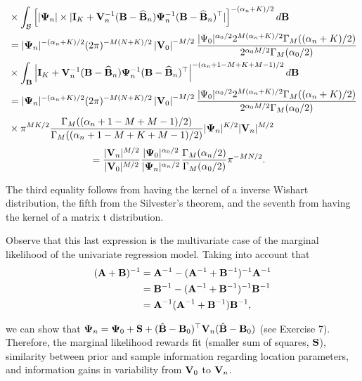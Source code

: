 \begin{align*}
	&\times \int_{\mathcal{B}}\left[|{\bf{\Psi}}_n|\times |{\bf{I}}_{K}+{\bf{V}}_n^{-1}({\bf{B}}-\widehat{\bf{B}}_n){\bf{\Psi}}_n^{-1}({\bf{B}}-\widehat{\bf{B}}_n)^{\top}|\right]^{-(\alpha_n+K)/2}d{\bf{B}}\\
	&=|{\bf{\Psi}}_n|^{-(\alpha_n+K)/2}(2\pi)^{-M(N+K)/2}\left|{\bf V}_0\right|^{-M/2}\frac{|\Psi_0|^{\alpha_0/2}2^{M(\alpha_n+K)/2}\Gamma_M((\alpha_n+K)/2)}{2^{\alpha_0M/2}\Gamma_M(\alpha_0/2)}\\
	&\times \int_{\mathcal{{\bf{B}}}}\left| {\bf{I}}_{K}+{\bf{V}}_n^{-1}({\bf{B}}-\widehat{\bf{B}}_n){\bf{\Psi}}_n^{-1}({\bf{B}}-\widehat{\bf{B}}_n)^{\top}\right|^{-(\alpha_n+1-M+K+M-1)/2}d{\bf{B}}\\
	&=|{\bf{\Psi}}_n|^{-(\alpha_n+K)/2}(2\pi)^{-M(N+K)/2}\left|{\bf V}_0\right|^{-M/2}\frac{|\Psi_0|^{\alpha_0/2}2^{M(\alpha_n+K)/2}\Gamma_M((\alpha_n+K)/2)}{2^{\alpha_0M/2}\Gamma_M(\alpha_0/2)}\\
	&\times \pi^{MK/2}\frac{\Gamma_M((\alpha_n+1-M+M-1)/2)}{\Gamma_M((\alpha_n+1-M+K+M-1)/2)}|{\bf{\Psi}}_n|^{K/2}|{\bf{V}}_n|^{M/2}\\
\end{align*}
\begin{align*}
	&=\frac{|{\bf{V}}_n|^{M/2}}{|{\bf{V}}_0|^{M/2}}\frac{|{\bf{\Psi}}_0|^{\alpha_0/2}}{|{\bf{\Psi}}_n|^{\alpha_n/2}}\frac{\Gamma_M(\alpha_n/2)}{\Gamma_M(\alpha_0/2)}\pi^{-MN/2}.  
\end{align*}

The third equality follows from having the kernel of a inverse Wishart distribution, the fifth from the Silvester's theorem, and the seventh from having the kernel of a matrix t distribution.

Observe that this last expression is the multivariate case of the marginal likelihood of the univariate regression model. Taking into account that 
\begin{align*}
	({\bf{A}}+{\bf{B}})^{-1}&={\bf{A}}^{-1}-({\bf{A}}^{-1}+{\bf{B}}^{-1})^{-1}{\bf{A}}^{-1}\\
	&={\bf{B}}^{-1}-({\bf{A}}^{-1}+{\bf{B}}^{-1})^{-1}{\bf{B}}^{-1}\\
	&={\bf{A}}^{-1}({\bf{A}}^{-1}+{\bf{B}}^{-1}){\bf{B}}^{-1},
\end{align*} 

we can show that ${\bf{\Psi}}_{n}={\bf{\Psi}}_{0}+{\bf{S}}+(\hat{\bf{B}}-{\bf{B}}_{0})^{\top}{\bf{V}}_{n}(\hat{\bf{B}}-{\bf{B}}_{0})$ (see Exercise 7). Therefore, the marginal likelihood rewards fit (smaller sum of squares, ${\bf{S}}$), similarity between prior and sample information regarding location parameters, and information gains in variability from ${\bf{V}}_0$ to ${\bf{V}}_n$.   

